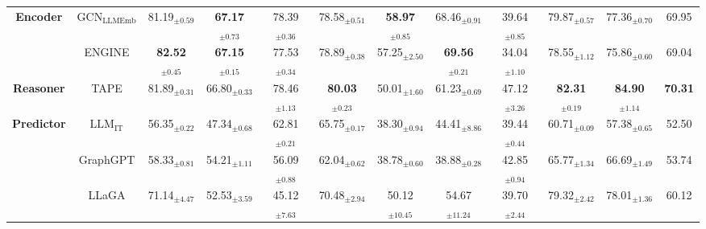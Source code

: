 \begin{table*}[!h]
{\begin{tabular}{cc|cccccccccc}
        \multirow{2}{*}{\textbf{Encoder}}  
       & $\text{GCN}_{\text{LLMEmb}}$ & 81.19$_{\pm \text{0.59}}$ & \cellcolor{orange!25} \cellcolor{orange!25} \textbf{67.17$_{\pm \text{0.73}}$} & 78.39$_{\pm \text{0.36}}$ & 78.58$_{\pm \text{0.51}}$ & \cellcolor{orange!25} \textbf{58.97$_{\pm \text{0.85}}$} & \cellcolor{orange!10} 68.46$_{\pm \text{0.91}}$ & 39.64$_{\pm \text{0.85}}$ & \cellcolor{orange!10} 79.87$_{\pm \text{0.57}}$ & 77.36$_{\pm \text{0.70}}$ &  \cellcolor{orange!10} 
 69.95 \\ 
       & ENGINE & \cellcolor{orange!25} \textbf{82.52$_{\pm \text{0.45}}$} & \cellcolor{orange!10} \textbf{67.15$_{\pm \text{0.15}}$} & 77.53$_{\pm \text{0.34}}$ & \cellcolor{orange!10} 78.89$_{\pm \text{0.38}}$ & 57.25$_{\pm \text{2.50}}$ & \cellcolor{orange!25} \textbf{69.56$_{\pm \text{0.21}}$} & 34.04$_{\pm \text{1.10}}$ & 78.55$_{\pm \text{1.12}}$ & 75.86$_{\pm \text{0.60}}$ & 69.04 \\  \midrule
       
       \textbf{Reasoner} & TAPE & \cellcolor{orange!10} 81.89$_{\pm \text{0.31}}$ & 66.80$_{\pm \text{0.33}}$ & \cellcolor{orange!10} 78.46$_{\pm \text{1.13}}$ & \cellcolor{orange!25} \textbf{80.03$_{\pm \text{0.23}}$} & 50.01$_{\pm \text{1.60}}$ & 61.23$_{\pm \text{0.69}}$ & \cellcolor{orange!10} 47.12$_{\pm \text{3.26}}$ & \cellcolor{orange!25} \textbf{82.31$_{\pm \text{0.19}}$} & \cellcolor{orange!25} \textbf{84.90$_{\pm \text{1.14}}$} & \cellcolor{orange!25} \textbf{70.31} \\  \midrule
       
      \multirow{3}{*}{\textbf{Predictor}} & $\text{LLM}_{\text{IT}}$ & 56.35$_{\pm \text{0.22}}$ & 47.34$_{\pm \text{0.68}}$ & 62.81$_{\pm \text{0.21}}$ & 65.75$_{\pm \text{0.17}}$ & 38.30$_{\pm \text{0.94}}$ & 44.41$_{\pm \text{8.86}}$ & 39.44$_{\pm \text{0.44}}$ & 60.71$_{\pm \text{0.09}}$ & 57.38$_{\pm \text{0.65}}$ & 52.50 \\
       & GraphGPT & 58.33$_{\pm \text{0.81}}$ & 54.21$_{\pm \text{1.11}}$ & 56.09$_{\pm \text{0.88}}$ & 62.04$_{\pm \text{0.62}}$ & 38.78$_{\pm \text{0.60}}$ & 38.88$_{\pm \text{0.28}}$ & 42.85$_{\pm \text{0.94}}$ & 65.77$_{\pm \text{1.34}}$ & 66.69$_{\pm \text{1.49}}$ & 53.74  \\ 
       & LLaGA  & 71.14$_{\pm \text{4.47}}$ & 52.53$_{\pm \text{3.59}}$ & 45.12$_{\pm \text{7.63}}$ & 70.48$_{\pm \text{2.94}}$ & 50.12$_{\pm \text{10.45}}$ & 54.67$_{\pm \text{11.24}}$ & 39.70$_{\pm \text{2.44}}$ & 79.32$_{\pm \text{2.42}}$ & \cellcolor{orange!10} 78.01$_{\pm \text{1.36}}$ & 60.12 \\ \bottomrule
    \end{tabular}
    }


\end{table*}
